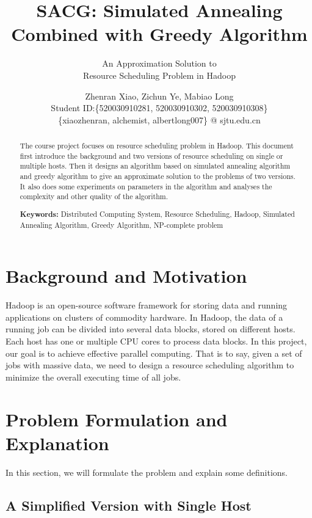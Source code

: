 \documentclass{llncs}
\title{SACG: Simulated Annealing Combined with Greedy Algorithm}
\subtitle{An Approximation Solution to \\ Resource Scheduling Problem in Hadoop}
\author{Zhenran Xiao, Zichun Ye, Mabiao Long \\
	Student ID:\{520030910281, 520030910302, 520030910308\} \\
	\{xiaozhenran, alchemist, albertlong007\} @ sjtu.edu.cn
}
\institute{Department of Computer Science and Engineering, \\ Shanghai Jiao Tong University, Shanghai, China}
\begin{document}
	
	
	
	\maketitle
	\begin{abstract}\vspace{-5mm}
		
		The course project focuses on resource scheduling problem in Hadoop. This document first introduce the background and two versions of resource scheduling on single or multiple hosts. Then it designs an algorithm based on simulated annealing algorithm and greedy algorithm to give an approximate solution to the problems of two versions. It also does some experiments on parameters in the algorithm and analyses the complexity and other quality of the algorithm.  
		
		\textbf{Keywords:} Distributed Computing System, Resource Scheduling, Hadoop, Simulated Annealing Algorithm, Greedy Algorithm, NP-complete problem
	\end{abstract}
	
	\section{Background and Motivation}
	\label{sec-Hadoop}
	
	Hadoop is an open-source software framework for storing data and running applications on clusters of commodity hardware. In Hadoop, the data of a running job can be divided into several data blocks, stored on different hosts. Each host has one or multiple CPU cores to process data blocks. In this project, our goal is to achieve effective parallel computing. That is to say, given a set of jobs with massive data, we need to design a resource scheduling algorithm to minimize the overall executing time of all jobs.
	
	
	
	\section{Problem Formulation and Explanation}
	\label{sec-problem}
	In this section, we will formulate the problem and explain some definitions.
	
	\subsection{A Simplified Version with Single Host} \label{subsec-task1}
	
\end{document}

